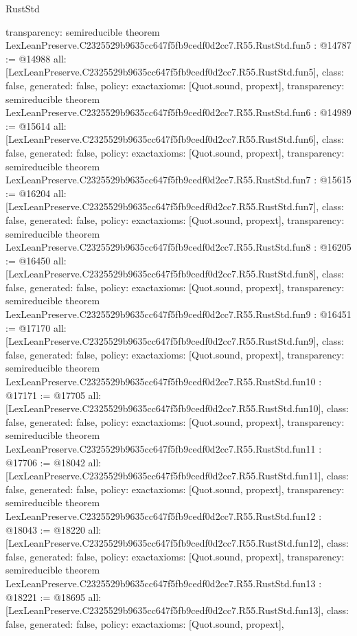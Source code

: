 \begin{lexlean}{RustStd}
\begin{coremodule}
{  transparency: semireducible
}
theorem LexLeanPreserve.C2325529b9635cc647f5fb9cedf0d2cc7.R55.RustStd.fun5 : @14787 := @14988 {
  all: [LexLeanPreserve.C2325529b9635cc647f5fb9cedf0d2cc7.R55.RustStd.fun5],
  class: false,
  generated: false,
  policy: exact{axioms: [Quot.sound, propext]},
  transparency: semireducible
}
theorem LexLeanPreserve.C2325529b9635cc647f5fb9cedf0d2cc7.R55.RustStd.fun6 : @14989 := @15614 {
  all: [LexLeanPreserve.C2325529b9635cc647f5fb9cedf0d2cc7.R55.RustStd.fun6],
  class: false,
  generated: false,
  policy: exact{axioms: [Quot.sound, propext]},
  transparency: semireducible
}
theorem LexLeanPreserve.C2325529b9635cc647f5fb9cedf0d2cc7.R55.RustStd.fun7 : @15615 := @16204 {
  all: [LexLeanPreserve.C2325529b9635cc647f5fb9cedf0d2cc7.R55.RustStd.fun7],
  class: false,
  generated: false,
  policy: exact{axioms: [Quot.sound, propext]},
  transparency: semireducible
}
theorem LexLeanPreserve.C2325529b9635cc647f5fb9cedf0d2cc7.R55.RustStd.fun8 : @16205 := @16450 {
  all: [LexLeanPreserve.C2325529b9635cc647f5fb9cedf0d2cc7.R55.RustStd.fun8],
  class: false,
  generated: false,
  policy: exact{axioms: [Quot.sound, propext]},
  transparency: semireducible
}
theorem LexLeanPreserve.C2325529b9635cc647f5fb9cedf0d2cc7.R55.RustStd.fun9 : @16451 := @17170 {
  all: [LexLeanPreserve.C2325529b9635cc647f5fb9cedf0d2cc7.R55.RustStd.fun9],
  class: false,
  generated: false,
  policy: exact{axioms: [Quot.sound, propext]},
  transparency: semireducible
}
theorem LexLeanPreserve.C2325529b9635cc647f5fb9cedf0d2cc7.R55.RustStd.fun10 : @17171 := @17705 {
  all: [LexLeanPreserve.C2325529b9635cc647f5fb9cedf0d2cc7.R55.RustStd.fun10],
  class: false,
  generated: false,
  policy: exact{axioms: [Quot.sound, propext]},
  transparency: semireducible
}
theorem LexLeanPreserve.C2325529b9635cc647f5fb9cedf0d2cc7.R55.RustStd.fun11 : @17706 := @18042 {
  all: [LexLeanPreserve.C2325529b9635cc647f5fb9cedf0d2cc7.R55.RustStd.fun11],
  class: false,
  generated: false,
  policy: exact{axioms: [Quot.sound, propext]},
  transparency: semireducible
}
theorem LexLeanPreserve.C2325529b9635cc647f5fb9cedf0d2cc7.R55.RustStd.fun12 : @18043 := @18220 {
  all: [LexLeanPreserve.C2325529b9635cc647f5fb9cedf0d2cc7.R55.RustStd.fun12],
  class: false,
  generated: false,
  policy: exact{axioms: [Quot.sound, propext]},
  transparency: semireducible
}
theorem LexLeanPreserve.C2325529b9635cc647f5fb9cedf0d2cc7.R55.RustStd.fun13 : @18221 := @18695 {
  all: [LexLeanPreserve.C2325529b9635cc647f5fb9cedf0d2cc7.R55.RustStd.fun13],
  class: false,
  generated: false,
  policy: exact{axioms: [Quot.sound, propext]},
}
\end{coremodule}
\end{lexlean}
